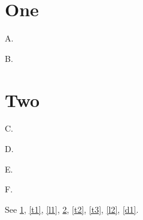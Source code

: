 \documentclass[envcountreset]{svjour3}
\begin{document}
\section{One}\label{s1}
\begin{theorem}\label{t1}A.\end{theorem}
\begin{lemma}\label{l1}B.\end{lemma}
\section{Two}\label{s2}
\begin{theorem}\label{t2}C.\end{theorem}
\begin{theorem}\label{t3}D.\end{theorem}
\begin{lemma}\label{l2}E.\end{lemma}
\begin{definition}\label{d1}F.\end{definition}
See \ref{s1}, \ref{t1}, \ref{l1}, \ref{s2}, \ref{t2}, \ref{t3}, \ref{l2}, \ref{d1}.
\end{document}
